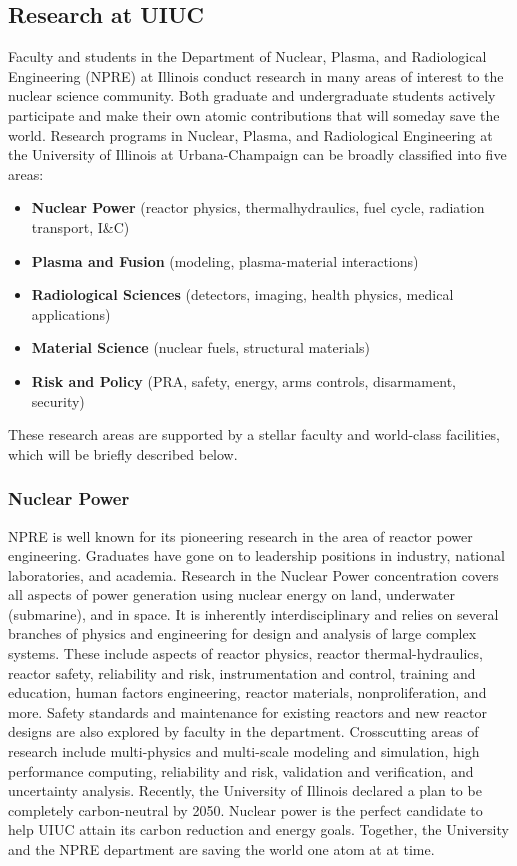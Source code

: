 \subsection{Research at UIUC}
Faculty and students in the Department of Nuclear, Plasma, and Radiological Engineering (NPRE) at Illinois conduct research in many areas of interest to the nuclear science community. Both graduate and undergraduate  students actively participate and make their own atomic contributions that will someday save the world.
Research programs in Nuclear, Plasma, and Radiological Engineering at the University of Illinois at Urbana-Champaign can be
broadly classified into five areas:
\begin{itemize}
        \item \textbf{Nuclear Power} (reactor physics, thermalhydraulics, fuel cycle, radiation transport, I\&C)
        \item \textbf{Plasma and Fusion} (modeling, plasma-material interactions)
        \item \textbf{Radiological Sciences} (detectors, imaging, health physics, medical applications)
        \item \textbf{Material Science} (nuclear fuels, structural materials)
        \item \textbf{Risk and Policy} (PRA, safety, energy, arms controls, disarmament, security)
\end{itemize}

These research areas are supported by a stellar faculty and world-class facilities, which 
will be briefly described below.

\subsubsection{Nuclear Power}
NPRE is well known for its pioneering research in the area of reactor power engineering. Graduates have gone on to leadership positions in industry, national laboratories, and academia. Research in the Nuclear Power concentration covers all aspects of power generation using nuclear energy on land, underwater (submarine), and in space. It is inherently interdisciplinary and relies on several branches of physics and engineering for design and analysis of large complex systems. These include aspects of reactor physics, reactor thermal-hydraulics, reactor safety, reliability and risk, instrumentation and control, training and education, human factors engineering, reactor materials, nonproliferation, and more. Safety standards and maintenance for existing reactors and new reactor designs are also explored by faculty in the department. Crosscutting areas of research include multi-physics and multi-scale modeling and simulation, high performance computing, reliability and risk, validation and verification, and uncertainty analysis. Recently, the University of Illinois declared a plan to be completely carbon-neutral by 2050. Nuclear power is the perfect candidate to help UIUC attain its carbon reduction and energy goals. Together, the University and the NPRE department are saving the world one atom at at time.

